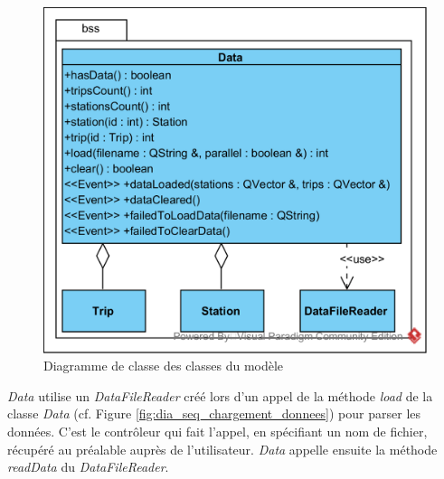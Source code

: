 \documentclass[12pt]{article}
\begin{document}
		\begin{figure}[!h]
		\begin{center}
		\includegraphics[scale=1]{dia_class_modele.png}
		\caption{Diagramme de classe des classes du modèle}
		\label{fig:dia_classe_modele}
		\end{center}
		\end{figure}
		
		\textit{Data} utilise un \textit{DataFileReader} créé lors d’un appel de la méthode \textit{load} de la classe \textit{Data} (cf. Figure \ref{fig:dia_seq_chargement_donnees}) pour parser les données. C’est le contrôleur qui fait l’appel, en spécifiant un nom de fichier, récupéré au préalable auprès de l’utilisateur. \textit{Data} appelle ensuite la méthode \textit{readData} du \textit{DataFileReader}.\\
	
\end{document}
